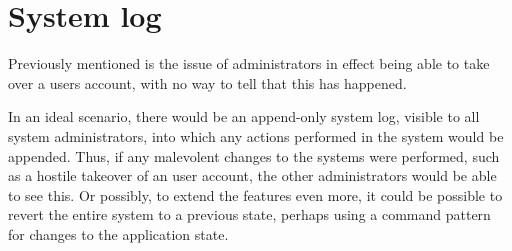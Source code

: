 \documentclass[../../master.tex]{subfiles}
\begin{document}
\section{System log}
Previously mentioned is the issue of administrators in effect being able to take over a users account, with no way to tell that this has happened.

In an ideal scenario, there would be an append-only system log, visible to all system administrators, into which any actions performed in the system would be appended.
Thus, if any malevolent changes to the systems were performed, such as a hostile takeover of an user account, the other administrators would be able to see this.
Or possibly, to extend the features even more, it could be possible to revert the entire system to a previous state, perhaps using a command pattern for changes to the application state.
\end{document}

